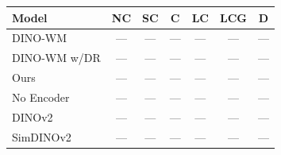 \begin{tabular}{lcccccc}
\hline
Model & NC & SC & C & LC & LCG & D \\
\hline
DINO-WM & --- & --- & --- & --- & --- & --- \\
DINO-WM w/DR & --- & --- & --- & --- & --- & --- \\
Ours & --- & --- & --- & --- & --- & --- \\
No Encoder & --- & --- & --- & --- & --- & --- \\
DINOv2 & --- & --- & --- & --- & --- & --- \\
SimDINOv2 & --- & --- & --- & --- & --- & --- \\
\hline
\end{tabular}
